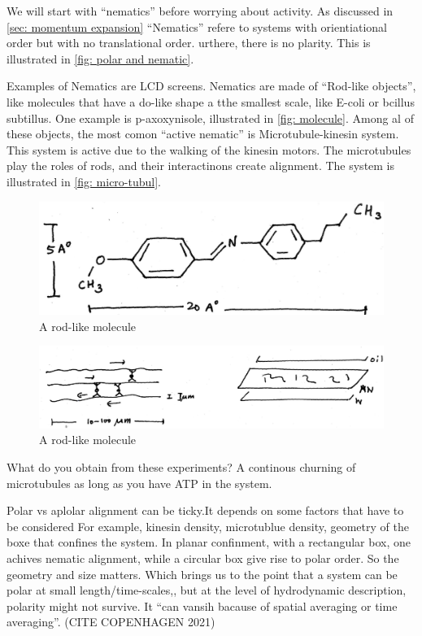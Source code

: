 We will start with ``nematics'' before worrying about activity.
As discussed in \autoref{sec: momentum expansion} ``Nematics'' refere to systems with orientiational order but with no translational order.
urthere, there is no plarity.
This is illustrated in \autoref{fig: polar and nematic}.

Examples of Nematics are LCD screens.
Nematics are made of ``Rod-like objects'', like molecules that have a do-like shape a tthe smallest scale, like E-coli or bcillus subtillus.
One example is p-axoxynisole, illustrated in \autoref{fig: molecule}. 
Among al of these objects, the most comon ``active nematic'' is Microtubule-kinesin system.
This system is active due to the walking of the  kinesin motors.
The microtubules play the roles of rods, and their interactinons create alignment.
The system is illustrated in \autoref{fig: micro-tubul}.

\begin{figure}[!htb]
    \centering
    \includegraphics[width=.6\textwidth]{chapters/Figures/nematics/molecule.png}
    \caption{A rod-like molecule}
    \label{fig: molecule}
\end{figure}

\begin{figure}[!htb]
    \centering
    \includegraphics[width=.6\textwidth]{chapters/Figures/nematics/microtubules.png}
    \caption{A rod-like molecule}
    \label{fig: micro-tubul}
\end{figure}

What do you obtain from these experiments?
A continous churning of microtubules as long as you have ATP in the system.

Polar vs aplolar alignment can be ticky.It depends on some factors that have to be considered
For example, kinesin density, microtublue density, geometry of the boxe that confines the system.
In planar confinment, with a rectangular box, one achives nematic alignment, while a circular box give rise to polar order.
So the geometry and size matters.
Which brings us to the point that a system can be polar at small length/time-scales,, but at the level of hydrodynamic description, polarity might not survive.
It ``can vansih bacause of spatial averaging or time averaging''. (CITE COPENHAGEN 2021)

